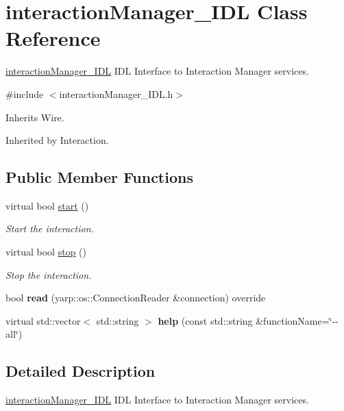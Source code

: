 \section{interaction\+Manager\+\_\+\+I\+DL Class Reference}
\label{classinteractionManager__IDL}


\mbox{\hyperlink{classinteractionManager__IDL}{interaction\+Manager\+\_\+\+I\+DL}} I\+DL Interface to Interaction Manager services.  




{\ttfamily \#include $<$interaction\+Manager\+\_\+\+I\+D\+L.\+h$>$}



Inherits Wire.



Inherited by Interaction.

\subsection*{Public Member Functions}
\begin{DoxyCompactItemize}
\item 
virtual bool \mbox{\hyperlink{classinteractionManager__IDL_ad6c8ab9126614fd7e07968e4c430be25}{start}} ()
\begin{DoxyCompactList}\small\item\em Start the interaction. \end{DoxyCompactList}\item 
virtual bool \mbox{\hyperlink{classinteractionManager__IDL_a0a3e324a4ab82896e627e83803137595}{stop}} ()
\begin{DoxyCompactList}\small\item\em Stop the interaction. \end{DoxyCompactList}\item 
\mbox{\label{classinteractionManager__IDL_ab3d4dbd821243f67cdbc2140f57932b5}} 
bool {\bfseries read} (yarp\+::os\+::\+Connection\+Reader \&connection) override
\item 
\mbox{\label{classinteractionManager__IDL_aae35412842de23ee93849813d7e4b2e7}} 
virtual std\+::vector$<$ std\+::string $>$ {\bfseries help} (const std\+::string \&function\+Name=\char`\"{}-\/-\/all\char`\"{})
\end{DoxyCompactItemize}


\subsection{Detailed Description}
\mbox{\hyperlink{classinteractionManager__IDL}{interaction\+Manager\+\_\+\+I\+DL}} I\+DL Interface to Interaction Manager services. 

